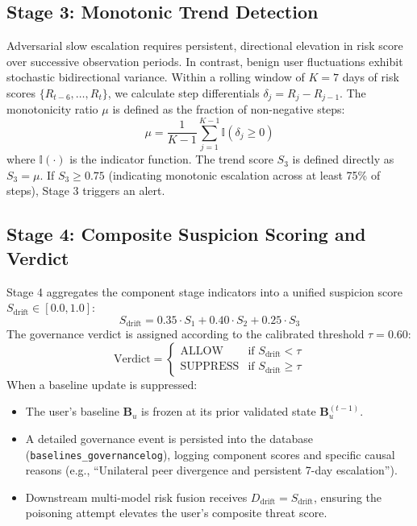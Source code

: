 \documentclass[conference]{IEEEtran}
\begin{document}
\subsection{Stage 3: Monotonic Trend Detection}
Adversarial slow escalation requires persistent, directional elevation in risk score over successive observation periods. In contrast, benign user fluctuations exhibit stochastic bidirectional variance.
Within a rolling window of $K = 7$ days of risk scores $\{R_{t-6}, \dots, R_t\}$, we calculate step differentials $\delta_j = R_j - R_{j-1}$. The monotonicity ratio $\mu$ is defined as the fraction of non-negative steps:
\begin{equation}
    \mu = \frac{1}{K-1} \sum_{j=1}^{K-1} \mathbb{I}(\delta_j \ge 0)
    \label{eq:p1_s3}
\end{equation}
where $\mathbb{I}(\cdot)$ is the indicator function. The trend score $S_3$ is defined directly as $S_3 = \mu$. If $S_3 \ge 0.75$ (indicating monotonic escalation across at least 75\% of steps), Stage 3 triggers an alert.

\subsection{Stage 4: Composite Suspicion Scoring and Verdict}
Stage 4 aggregates the component stage indicators into a unified suspicion score $S_{\text{drift}} \in [0.0, 1.0]$:
\begin{equation}
    S_{\text{drift}} = 0.35 \cdot S_1 + 0.40 \cdot S_2 + 0.25 \cdot S_3
    \label{eq:p1_sdrift}
\end{equation}
The governance verdict is assigned according to the calibrated threshold $\tau = 0.60$:
\begin{equation}
    \text{Verdict} = 
    \begin{cases}
        \text{ALLOW} & \text{if } S_{\text{drift}} < \tau \\
        \text{SUPPRESS} & \text{if } S_{\text{drift}} \ge \tau
    \end{cases}
    \label{eq:p1_verdict}
\end{equation}
When a baseline update is suppressed:
\begin{itemize}
    \item The user's baseline $\mathbf{B}_u$ is frozen at its prior validated state $\mathbf{B}_u^{(t-1)}$.
    \item A detailed governance event is persisted into the database (\texttt{baselines\_governancelog}), logging component scores and specific causal reasons (e.g., ``Unilateral peer divergence and persistent 7-day escalation'').
    \item Downstream multi-model risk fusion receives $D_{\text{drift}} = S_{\text{drift}}$, ensuring the poisoning attempt elevates the user's composite threat score.
\end{itemize}
\end{document}
